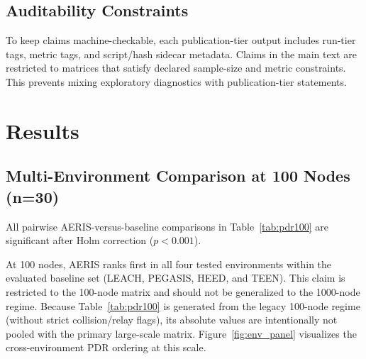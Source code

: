 ﻿\documentclass[sensors,article,submit,moreauthors,pdftex]{Definitions/mdpi}
\begin{document}
\subsection{Auditability Constraints}
To keep claims machine-checkable, each publication-tier output includes run-tier tags, metric tags, and script/hash sidecar metadata. Claims in the main text are restricted to matrices that satisfy declared sample-size and metric constraints. This prevents mixing exploratory diagnostics with publication-tier statements.

\section{Results}
\subsection{Multi-Environment Comparison at 100 Nodes (n=30)}
\begin{table}[H]
\caption{Legacy comparability matrix (strict collision/relay flags disabled): PDR by environment at 100 nodes (n=30 per environment-protocol cell).}
\label{tab:pdr100}
\centering
{}
\end{table}
All pairwise AERIS-versus-baseline comparisons in Table~\ref{tab:pdr100} are significant after Holm correction ($p<0.001$).

At 100 nodes, AERIS ranks first in all four tested environments within the evaluated baseline set (LEACH, PEGASIS, HEED, and TEEN). This claim is restricted to the 100-node matrix and should not be generalized to the 1000-node regime.
Because Table~\ref{tab:pdr100} is generated from the legacy 100-node regime (without strict collision/relay flags), its absolute values are intentionally not pooled with the primary large-scale matrix. Figure~\ref{fig:env_panel} visualizes the cross-environment PDR ordering at this scale.
\end{document}
